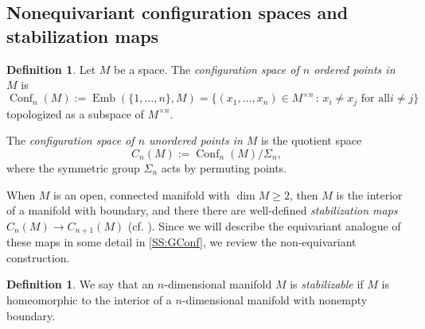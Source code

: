 \documentclass[11pt]{amsart}
\makeatletter
\theoremstyle{definition}
\newtheorem{definition}[equation]{Definition}
\numberwithin{equation}{subsection} %
\newcommand{\Conf}{\operatorname{Conf}}
\def\Emb{\operatorname{Emb}}
\newcommand{\x}{\times}
\renewcommand{\st}{\hspace{2pt} : \hspace{2pt}}
\newcommand{\switchmargin}{
\if@reversemargin
\normalmarginpar
\else
\reversemarginpar
\fi
}
\newcommand{\EvaNote}[1]
   {\marginpar{\raggedright\smaller \smaller \color{teal}#1}\switchmargin}
\makeatother
\begin{document}
\subsection{Nonequivariant configuration spaces and stabilization maps}\label{SS:Conf}


\begin{definition}\label{Def:Conf}
Let $M$ be a space.
The \emph{configuration space of $n$ ordered points in $M$} is
$$ \Conf_n(M):=\Emb(\{1,\ldots,n\},M)= \{ (x_1,\dots,x_n)\in M^{\x n} \st x_i \neq x_j \text{ for all
}i\neq j \} $$
topologized as a subspace of $M^{\x n}$.

The \emph{configuration space of $n$ unordered points in $M$} is the quotient space
$$C_n(M) := \Conf_n(M)/\Sigma_n,$$
where the symmetric group $\Sigma_n$ acts by permuting points. 
\end{definition}


When $M$ is an open, connected manifold with $\dim M\geq 2$, then $M$ is the interior of a manifold with boundary, and there there are well-defined \emph{stabilization maps} $C_n(M) \to C_{n+1}(M)$ (cf. \cite[Secs. 2.1-2.2]{Pal18}). Since we will describe the equivariant analogue of these maps in some detail in \cref{SS:GConf}, we review the non-equivariant construction.

\begin{definition}
We say that an $n$-dimensional manifold $M$ is \emph{stabilizable} if $M$ is homeomorphic to the interior of a $n$-dimensional manifold with nonempty boundary. 
\end{definition}
\end{document}
